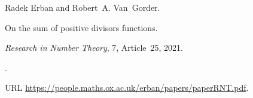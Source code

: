 Radek Erban and Robert~A. Van~Gorder.

\newblock On the sum of positive divisors functions.

\newblock \emph{Research in Number Theory}, 7, Article~25, 2021.

\newblock {}.

\newblock URL \url{https://people.maths.ox.ac.uk/erban/papers/paperRNT.pdf}.
